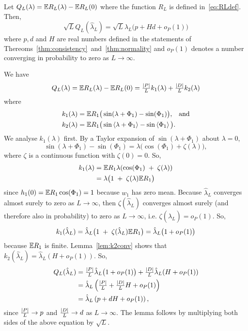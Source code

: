 \documentclass[journal]{IEEEtran}
\begin{document}
\begin{lemma}\label{lem:Qconv}
Let $Q_L(\lambda) = {\mathbb E} R_L(\lambda) - {\mathbb E} R_L(0)$ where the function $R_L$ is defined in~\eqref{eq:RLdef}.  Then,
\[ 
\sqrt{L} Q_L(\hat{\lambda}_L) = \sqrt{L} \hat{\lambda}_L\big( p + Hd  + o_P(1) \big)
\]
where $p, d$ and $H$ are real numbers defined in the statements of Thereoms~\ref{thm:consistency}~and~\ref{thm:normality} and $o_P(1)$ denotes a number converging in probability to zero as $L\rightarrow\infty$.
\end{lemma}
\begin{IEEEproof}
We have
\[
Q_L(\lambda) = {\mathbb E} R_L(\lambda) - {\mathbb E} R_L(0) = \tfrac{{\vert P \vert}}{L} k_1(\lambda) + \tfrac{{\vert D \vert}}{L} k_2(\lambda)
\]
where
\begin{align}
k_1(\lambda) &= {\mathbb E} R_1\big( \sin(\lambda + \Phi_1) - \sin(\Phi_1) \big), \;\;\; \text{and} \nonumber\\
k_2(\lambda) &= {\mathbb E} R_1\big( \sin\left\langle \lambda + \Phi_1 \right\rangle - \sin\left\langle \Phi_1 \right\rangle \big). \label{eq:k2def}
\end{align}
We analyse $k_1(\lambda)$ first.  By a Taylor expansion of $\sin(\lambda + \Phi_1)$ about $\lambda = 0$,
\[
\sin(\lambda + \Phi_1) - \sin(\Phi_1) = \lambda \big( \cos(\Phi_1) + \zeta(\lambda) \big),
\]
where $\zeta$ is a continuous function with $\zeta(0) = 0$.  So,
\begin{align*}
k_1(\lambda) &= {\mathbb E} R_1\lambda(\cos(\Phi_1) \; + \; \zeta(\lambda)) \\
&= \lambda \big( 1 \; + \; \zeta(\lambda) {\mathbb E} R_1 \big) 
\end{align*}
since $h_1(0) = {\mathbb E} R_1\cos(\Phi_1) = 1$ because $w_1$ has zero mean.  Because $\hat{\lambda}_L$ converges almost surely to zero as $L \rightarrow\infty$, then $\zeta(\hat{\lambda}_L)$ converges almost surely (and therefore also in probability) to zero as $L \rightarrow\infty$, i.e. $\zeta(\hat{\lambda}_L) = o_P(1)$.  So, 
\[
k_1(\hat{\lambda}_L) = \hat{\lambda}_L \big( 1 \; + \; \zeta(\hat{\lambda}_L) {\mathbb E} R_1 \big) = \hat{\lambda}_L \big( 1  + o_P(1)\big)
\]
because ${\mathbb E} R_1$ is finite.  Lemma~\ref{lem:k2conv} shows that $k_2(\hat{\lambda}_L) = \hat{\lambda}_L ( H + o_P(1) )$.  So,
\begin{align*}
Q_L(\hat{\lambda}_L) &=  \tfrac{{\vert P \vert}}{L} \hat{\lambda}_L \big( 1  + o_P(1)\big)  + \tfrac{{\vert D \vert}}{L} \hat{\lambda}_L ( H + o_P(1) ) \\
&= \hat{\lambda}_L \left( \tfrac{{\vert P \vert}}{L}  + \tfrac{{\vert D \vert}}{L} H + o_P(1) \right) \\
&= \hat{\lambda}_L \left( p  + d H + o_P(1) \right),
\end{align*}
since $\frac{{\vert P \vert}}{L} \rightarrow p$ and $\frac{{\vert D \vert}}{L} \rightarrow d$ as $L \rightarrow \infty$.  The lemma follows by multiplying both sides of the above equation by $\sqrt{L}$.
\end{IEEEproof}
\end{document}
